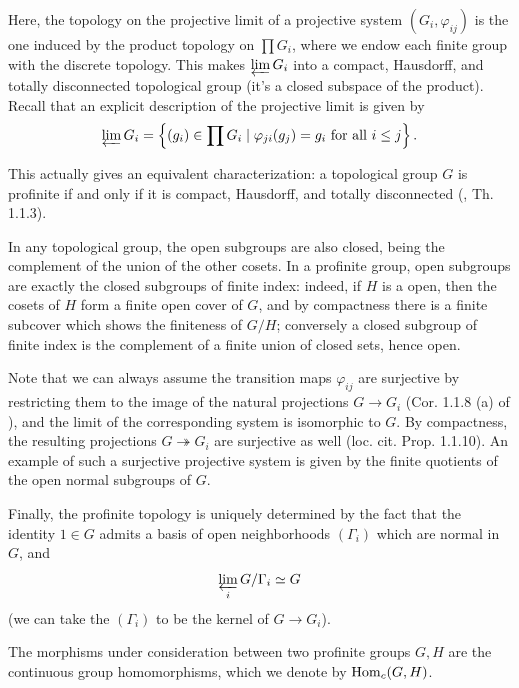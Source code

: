 \documentclass[a4paper, oneside]{memoir}
\begin{document}
Here, the topology on the projective limit of a projective system $(G_i,\varphi_{ij})$ is the one induced by the product topology on $\prod{G_i}$, where we endow each finite group with the discrete topology. This makes $\varprojlim{G_i}$ into a compact, Hausdorff, and totally disconnected topological group (it's a closed subspace of the product). Recall that an explicit description of the projective limit is given by
\[
	\varprojlim{G_i} = \left\{ (g_i) \in \prod{G_i} \mid \varphi_{ji}(g_j)=g_i \text{ for all } i\leq j \right\}.
\]

\begin{remark}\label{rm:CptTotDisc}
	This actually gives an equivalent characterization: a topological group $G$ is profinite if and only if it is compact, Hausdorff, and totally disconnected (\cite{Neukirch}, Th. 1.1.3).
\end{remark}

In any topological group, the open subgroups are also closed, being the complement of the union of the other cosets. In a profinite group, open subgroups are exactly the closed subgroups of finite index: indeed, if $H$ is a open, then the cosets of $H$ form a finite open cover of $G$, and by compactness there is a finite subcover which shows the finiteness of $G/H$; conversely a closed subgroup of finite index is the complement of a finite union of closed sets, hence open.

Note that we can always assume the transition maps $\varphi_{ij}$ are surjective by restricting them to the image of the natural projections $G \to G_i$ (Cor. 1.1.8 (a) of \cite{RibesZalesskii}), and the limit of the corresponding system is isomorphic to $G$. By compactness, the resulting projections $G\twoheadrightarrow G_i$ are surjective as well (loc. cit. Prop. 1.1.10). An example of such a surjective projective system is given by the finite quotients of the open normal subgroups of $G$.

Finally, the profinite topology is uniquely determined by the fact that the identity $1\in G$ admits a basis of open neighborhoods $(\Gamma_i)$ which are normal in $G$, and \[\varprojlim_i{G /\Gamma_i}\simeq G\] (we can take the $(\Gamma_i)$ to be the kernel of $G\to G_i$).

The morphisms under consideration between two profinite groups $G,H$ are the continuous group homomorphisms, which we denote by $\operatorname{Hom}_{c}(G,H)$.
\end{document}
